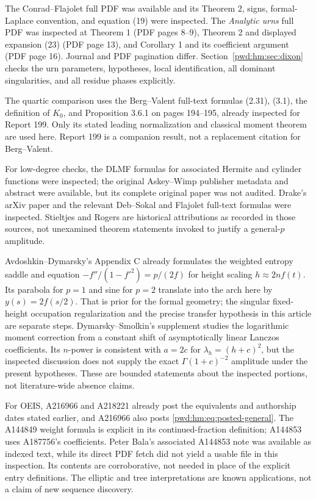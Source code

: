 \documentclass[11pt,letterpaper]{article}
\numberwithin{equation}{section}
\theoremstyle{remark}\newtheorem{remark}[theorem]{Remark}
\begin{document}
 The Conrad--Flajolet full PDF was available and its Theorem 2, signs, formal-Laplace convention, and equation (19) were inspected. The \emph{Analytic urns} full PDF was inspected at Theorem 1 (PDF pages 8--9), Theorem 2 and displayed expansion (23) (PDF page 13), and Corollary 1 and its coefficient argument (PDF page 16). Journal and PDF pagination differ. Section~\ref{pwd:hm:sec:dixon} checks the urn parameters, hypotheses, local identification, all dominant singularities, and all residue phases explicitly.

The quartic comparison uses the Berg--Valent full-text formulas (2.31), (3.1), the definition of $K_0$, and Proposition 3.6.1 on pages 194--195, already inspected for Report 199. Only its stated leading normalization and classical moment theorem are used here. Report 199 is a companion result, not a replacement citation for Berg--Valent.

For low-degree checks, the DLMF formulas for associated Hermite and cylinder functions were inspected; the original Askey--Wimp publisher metadata and abstract were available, but its complete original paper was not audited. Drake's arXiv paper and the relevant Deb--Sokal and Flajolet full-text formulas were inspected. Stieltjes and Rogers are historical attributions as recorded in those sources, not unexamined theorem statements invoked to justify a general-$p$ amplitude.

Avdoshkin--Dymarsky's Appendix C already formulates the weighted entropy saddle and equation
$-f''/(1-f'^2)=p/(2f)$ for height scaling $h\approx2nf(t)$. Its parabola for $p=1$ and sine for $p=2$ translate into the arch here by $y(s)=2f(s/2)$. That is prior for the formal geometry; the singular fixed-height occupation regularization and the precise transfer hypothesis in this article are separate steps. Dymarsky--Smolkin's supplement studies the logarithmic moment correction from a constant shift of asymptotically linear Lanczos coefficients. Its $n$-power is consistent with $a=2c$ for $\lambda_h=(h+c)^2$, but the inspected discussion does not supply the exact $\Gamma(1+c)^{-2}$ amplitude under the present hypotheses. These are bounded statements about the inspected portions, not literature-wide absence claims.

For OEIS, A216966 and A218221 already post the equivalents and authorship dates stated earlier, and A216966 also posts \eqref{pwd:hm:eq:posted-general}. The A144849 weight formula is explicit in its continued-fraction definition; A144853 uses A187756's coefficients. Peter Bala's associated A144853 note was available as indexed text, while its direct PDF fetch did not yield a usable file in this inspection. Its contents are corroborative, not needed in place of the explicit entry definitions. The elliptic and tree interpretations are known applications, not a claim of new sequence discovery.
\end{document}
